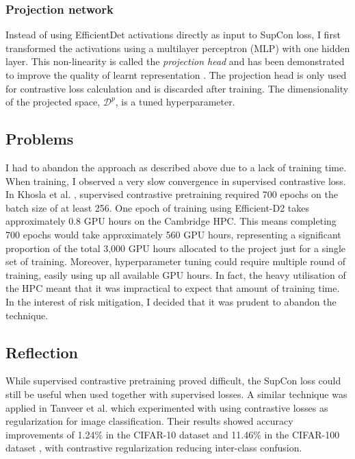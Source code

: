 \documentclass[12pt,a4paper,twoside,openany]{report}
\begin{document}
\subsubsection{Projection network}
Instead of using EfficientDet activations directly as input to SupCon loss, I first transformed the activations using a multilayer perceptron (MLP) with one hidden layer. This non-linearity is called the \textit{projection head} and has been demonstrated to improve the quality of learnt representation \cite{chen_simple_2020}. The projection head is only used for contrastive loss calculation and is discarded after training. The dimensionality of the projected space, $\mathcal{D}^p$, is a tuned hyperparameter. 


\subsection{Problems}
I had to abandon the approach as described above due to a lack of training time. When training, I observed a very slow convergence in supervised contrastive loss. 
In Khosla et al. \cite{khosla_supervised_2021}, supervised contrastive pretraining required 700 epochs on the batch size of at least 256.
One epoch of training using Efficient-D2 takes approximately 0.8 GPU hours on the Cambridge HPC. This means completing 700 epochs would take approximately 560 GPU hours, representing a significant proportion of the total 3,000 GPU hours allocated to the project just for a single set of training. Moreover, hyperparameter tuning could require multiple round of training, easily using up all available GPU hours. In fact, the heavy utilisation of the HPC meant that it was impractical to expect that amount of training time. In the interest of risk mitigation, I decided that it was prudent to abandon the technique.

\subsection{Reflection}
While supervised contrastive pretraining proved difficult, the SupCon loss could still be useful when used together with supervised losses. A similar technique was applied in Tanveer et al. \cite{tanveer_regularization_2021} which experimented with using contrastive losses as regularization for image classification. Their results showed accuracy improvements of 1.24\% in the CIFAR-10 dataset and 11.46\% in the CIFAR-100 dataset \cite{noauthor_cifar-10_nodate}, with contrastive regularization reducing inter-class confusion. 
\end{document}
